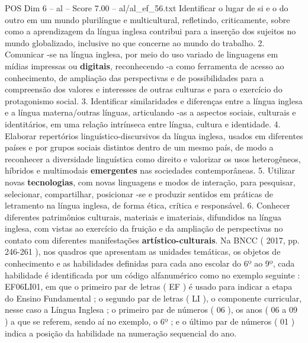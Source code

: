 \begin{textsample}{POS Dim 6 – al – Score 7.00 – al/al\_ef\_56.txt}
Identificar o lugar de si e o do outro em um mundo plurilíngue e multicultural, refletindo, criticamente, sobre como a aprendizagem da língua inglesa contribui para a inserção dos sujeitos no mundo globalizado, inclusive no que concerne ao mundo do trabalho. 2.
Comunicar -se na língua inglesa, por meio do uso variado de linguagens em mídias impressas ou \textbf{digitais}, reconhecendo -a como ferramenta de acesso ao conhecimento, de ampliação das perspectivas e de possibilidades para a compreensão dos valores e interesses de outras culturas e para o exercício do protagonismo social. 3.
Identificar similaridades e diferenças entre a língua inglesa e a língua materna/outras línguas, articulando -as a aspectos sociais, culturais e identitários, em uma relação intrínseca entre língua, cultura e identidade. 4.
Elaborar repertórios linguístico-discursivos da língua inglesa, usados em diferentes países e por grupos sociais distintos dentro de um mesmo país, de modo a reconhecer a diversidade linguística como direito e valorizar os usos heterogêneos, híbridos e multimodais \textbf{emergentes} nas sociedades contemporâneas. 5.
Utilizar novas \textbf{tecnologias}, com novas linguagens e modos de interação, para pesquisar, selecionar, compartilhar, posicionar -se e produzir sentidos em práticas de letramento na língua inglesa, de forma ética, crítica e responsável. 6.
Conhecer diferentes patrimônios culturais, materiais e imateriais, difundidos na língua inglesa, com vistas ao exercício da fruição e da ampliação de perspectivas no contato com diferentes manifestações \textbf{artístico-culturais}.
Na BNCC ( 2017, pp. 246-261 ), nos quadros que apresentam as unidades temáticas, os objetos de conhecimento e as habilidades definidas para cada ano escolar do 6º ao 9º, cada habilidade é identificada por um código alfanumérico como no exemplo seguinte : EF06LI01, em que o primeiro par de letras ( EF ) é usado para indicar a etapa do Ensino Fundamental ; o segundo par de letras ( LI ), o componente curricular, nesse caso a Língua Inglesa ; o primeiro par de números ( 06 ), os anos ( 06 a 09 ) a que se referem, sendo aí no exemplo, o 6º ; e o último par de números ( 01 ) indica a posição da habilidade na numeração sequencial do ano.

\end{textsample}
